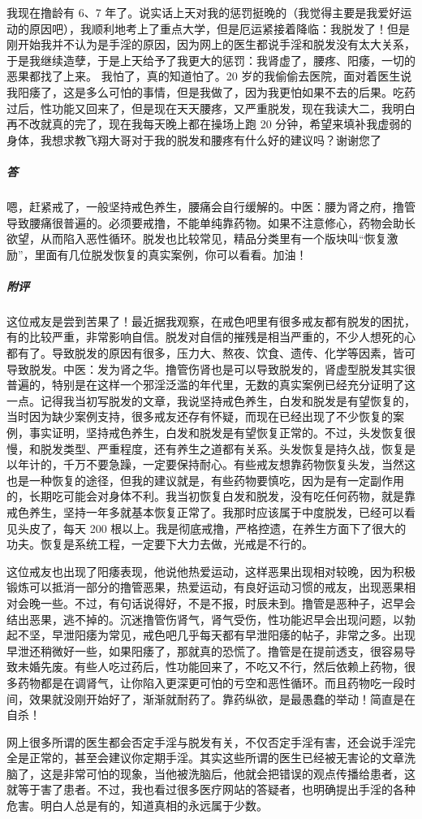 \begin{case}
    我现在撸龄有 6、7 年了。说实话上天对我的惩罚挺晚的（我觉得主要是我爱好运动的原因吧），我顺利地考上了重点大学，但是厄运紧接着降临：我脱发了！但是刚开始我并不认为是手淫的原因，因为网上的医生都说手淫和脱发没有太大关系，于是我继续造孽，于是上天给予了我更大的惩罚：我肾虚了，腰疼、阳痿，一切的恶果都找了上来。 我怕了，真的知道怕了。20 岁的我偷偷去医院，面对着医生说我阳痿了，这是多么可怕的事情，但是我做了，因为我更怕如果不去的后果。吃药过后，性功能又回来了，但是现在天天腰疼，又严重脱发，现在我读大二，我明白再不改就真的完了，现在我每天晚上都在操场上跑 20 分钟，希望来填补我虚弱的身体，我想求教飞翔大哥对于我的脱发和腰疼有什么好的建议吗？谢谢您了
    \subparagraph{答} 嗯，赶紧戒了，一般坚持戒色养生，腰痛会自行缓解的。中医：腰为肾之府，撸管导致腰痛很普遍的。必须要戒撸，不能单纯靠药物。如果不注意修心，药物会助长欲望，从而陷入恶性循环。脱发也比较常见，精品分类里有一个版块叫“恢复激励”，里面有几位脱发恢复的真实案例，你可以看看。加油！
    \subparagraph{附评} 这位戒友是尝到苦果了！最近据我观察，在戒色吧里有很多戒友都有脱发的困扰，有的比较严重，非常影响自信。脱发对自信的摧残是相当严重的，不少人想死的心都有了。导致脱发的原因有很多，压力大、熬夜、饮食、遗传、化学等因素，皆可导致脱发。中医：发为肾之华。撸管伤肾也是可以导致脱发的，肾虚型脱发其实很普遍的，特别是在这样一个邪淫泛滥的年代里，无数的真实案例已经充分证明了这一点。记得我当初写脱发的文章，我说坚持戒色养生，白发和脱发是有望恢复的，当时因为缺少案例支持，很多戒友还存有怀疑，而现在已经出现了不少恢复的案例，事实证明，坚持戒色养生，白发和脱发是有望恢复正常的。不过，头发恢复很慢，和脱发类型、严重程度，还有养生之道都有关系。头发恢复是持久战，恢复是以年计的，千万不要急躁，一定要保持耐心。有些戒友想靠药物恢复头发，当然这也是一种恢复的途径，但我的建议就是，有些药物要慎吃，因为是有一定副作用的，长期吃可能会对身体不利。我当初恢复白发和脱发，没有吃任何药物，就是靠戒色养生，坚持一年多就基本恢复正常了。我那时应该属于中度脱发，已经可以看见头皮了，每天 200 根以上。我是彻底戒撸，严格控遗，在养生方面下了很大的功夫。恢复是系统工程，一定要下大力去做，光戒是不行的。

    这位戒友也出现了阳痿表现，他说他热爱运动，这样恶果出现相对较晚，因为积极锻炼可以抵消一部分的撸管恶果，热爱运动，有良好运动习惯的戒友，出现恶果相对会晚一些。不过，有句话说得好，不是不报，时辰未到。撸管是恶种子，迟早会结出恶果，逃不掉的。沉迷撸管伤肾气，肾气受伤，性功能迟早会出现问题，以勃起不坚，早泄阳痿为常见，戒色吧几乎每天都有早泄阳痿的帖子，非常之多。出现早泄还稍微好一些，如果阳痿了，那就真的恐慌了。撸管是在提前透支，很容易导致未婚先废。有些人吃过药后，性功能回来了，不吃又不行，然后依赖上药物，很多药物都是在调肾气，让你陷入更深更可怕的亏空和恶性循环。而且药物吃一段时间，效果就没刚开始好了，渐渐就耐药了。靠药纵欲，是最愚蠢的举动！简直是在自杀！

    网上很多所谓的医生都会否定手淫与脱发有关，不仅否定手淫有害，还会说手淫完全是正常的，甚至会建议你定期手淫。其实这些所谓的医生已经被无害论的文章洗脑了，这是非常可怕的现象，当他被洗脑后，他就会把错误的观点传播给患者，这就等于害了患者。不过，我也看过很多医疗网站的答疑者，也明确提出手淫的各种危害。明白人总是有的，知道真相的永远属于少数。
\end{case}

